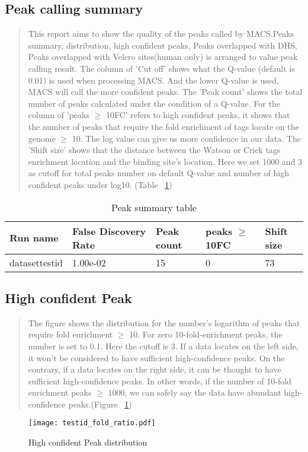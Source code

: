 \documentclass[11pt,a4paper]{article}
\begin{document}
\subsection{Peak calling summary}
\begin{quotation}
This report aims to show the quality of the peaks called by MACS.Peaks summary,  distribution, high confident peaks, Peaks overlapped with DHS, Peaks overlapped with Velcro sites(human only) is arranged to value peak calling result. 
The column of 'Cut off' shows what the Q-value (default is 0.01) is used when processing MACS. And the lower Q-value is used, MACS will call the more confident peaks. 
The 'Peak count' shows the total number of peaks calculated under the condition of a Q-value. 
For the column of 'peaks $\geq$ 10FC' refers to high confident peaks, it shows that the number of peaks that require the fold enrichment of tags locate on the genome $\geq$ 10. The log value can give us more confidence in our data.
The 'Shift size' shows that the distance between the Watson or Crick tags enrichment location and the binding site's location. Here we set 1000 and 3 as cutoff for total peaks number on default Q-value and number of high confident peaks under log10. (Table ~\ref{peaksum})
\end{quotation}

\begin{table}[h]
	\caption{Peak summary table} \label{peaksum}
\begin{tabularx}{\textwidth}{ |X|X|X|X|X| } 
\hline
Run name & False Discovery Rate & Peak count & peaks $\geq$ 10FC & Shift size \\
\hline
datasettestid &  1.00e-02 & 15 & 0 & 73 \\
\hline
\end{tabularx}
\end{table}
\newpage
\subsection{High confident Peak }
\begin{quotation}
The figure shows the distribution for the number's logarithm of peaks that require fold enrichment $\geq$ 10. For zero 10-fold-enrichment peaks, the number is set to 0.1. Here the cutoff is 3. If a data locates on the left side, it won't be considered to have sufficient high-confidence peaks. On the contrary, if a data locates on the right side, it can be thought to have sufficient high-confidence peaks. In other words, if the number of 10-fold enrichment peaks $\geq$ 1000, we can safely say the data have abundant high-confidence peaks.(Figure ~\ref{highconfipeak})
\end{quotation}
\begin{figure}[h] 
\caption{High confident Peak distribution} \label{highconfipeak}
\setlength{\abovecaptionskip}{0pt} 
\setlength{\belowcaptionskip}{10pt}
\centering
{\texttt{[image: testid\_fold\_ratio.pdf]}}
\end{figure}
\newpage
\end{document}
